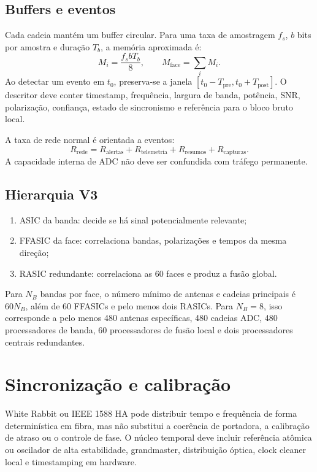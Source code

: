 \documentclass[11pt,a4paper]{report}
\begin{document}
\section{Buffers e eventos}

Cada cadeia mantém um buffer circular. Para uma taxa de amostragem $f_s$, $b$ bits por amostra e duração $T_b$, a memória aproximada é:
\[
M_i=\frac{f_s b T_b}{8},\qquad M_{\mathrm{face}}=\sum_i M_i.
\]
Ao detectar um evento em $t_0$, preserva-se a janela $[t_0-T_{\mathrm{pre}},t_0+T_{\mathrm{post}}]$. O descritor deve conter timestamp, frequência, largura de banda, potência, SNR, polarização, confiança, estado de sincronismo e referência para o bloco bruto local.

A taxa de rede normal é orientada a eventos:
\[
R_{\mathrm{rede}}=R_{\mathrm{alertas}}+R_{\mathrm{telemetria}}+R_{\mathrm{resumos}}+R_{\mathrm{capturas}}.
\]
A capacidade interna de ADC não deve ser confundida com tráfego permanente.

\section{Hierarquia V3}
\begin{enumerate}
\item ASIC da banda: decide se há sinal potencialmente relevante;
\item FFASIC da face: correlaciona bandas, polarizações e tempos da mesma direção;
\item RASIC redundante: correlaciona as 60 faces e produz a fusão global.
\end{enumerate}

Para $N_B$ bandas por face, o número mínimo de antenas e cadeias principais é $60N_B$, além de 60 FFASICs e pelo menos dois RASICs. Para $N_B=8$, isso corresponde a pelo menos 480 antenas específicas, 480 cadeias ADC, 480 processadores de banda, 60 processadores de fusão local e dois processadores centrais redundantes.

\chapter{Sincronização e calibração}

White Rabbit ou IEEE 1588 HA pode distribuir tempo e frequência de forma determinística em fibra, mas não substitui a coerência de portadora, a calibração de atraso ou o controle de fase. O núcleo temporal deve incluir referência atômica ou oscilador de alta estabilidade, grandmaster, distribuição óptica, clock cleaner local e timestamping em hardware.
\end{document}

